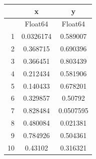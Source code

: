 \begin{tabular}{r|cc}
	& x & y\\
	\hline
	& Float64 & Float64\\
	\hline
	1 & 0.0326174 & 0.589007 \\
	2 & 0.368715 & 0.690396 \\
	3 & 0.366451 & 0.803439 \\
	4 & 0.212434 & 0.581906 \\
	5 & 0.140433 & 0.678201 \\
	6 & 0.329857 & 0.50792 \\
	7 & 0.828484 & 0.0507595 \\
	8 & 0.480084 & 0.021381 \\
	9 & 0.784926 & 0.504361 \\
	10 & 0.43102 & 0.316321 \\
\end{tabular}
